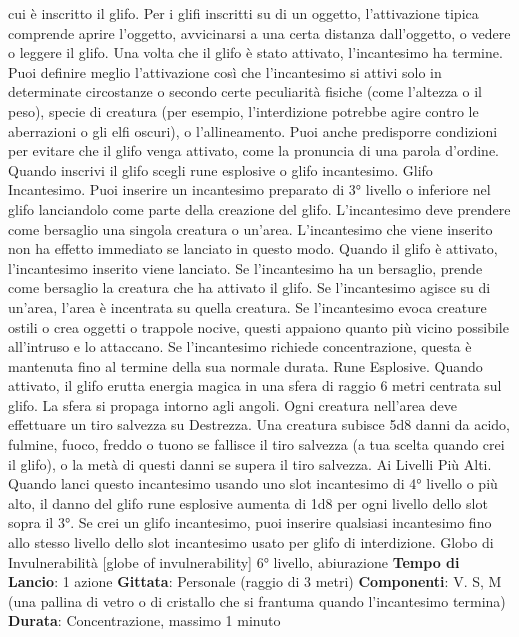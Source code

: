\begin{multicols}{2}
cui è inscritto il glifo.
Per i glifi inscritti su di un oggetto, l’attivazione tipica
comprende aprire l’oggetto, avvicinarsi a una certa
distanza dall’oggetto, o vedere o leggere il glifo. Una
volta che il glifo è stato attivato, l’incantesimo ha
termine.
Puoi definire meglio l’attivazione così che l’incantesimo
si attivi solo in determinate circostanze o secondo certe
peculiarità fisiche (come l’altezza o il peso), specie di
creatura (per esempio, l’interdizione potrebbe agire
contro le aberrazioni o gli elfi oscuri), o l’allineamento.
Puoi anche predisporre condizioni per evitare che il glifo
venga attivato, come la pronuncia di una parola
d’ordine.
Quando inscrivi il glifo scegli rune esplosive o glifo
incantesimo.
Glifo Incantesimo. Puoi inserire un incantesimo
preparato di 3° livello o inferiore nel glifo lanciandolo
come parte della creazione del glifo. L’incantesimo
deve prendere come bersaglio una singola creatura o
un’area. L’incantesimo che viene inserito non ha effetto
immediato se lanciato in questo modo. Quando il glifo è
attivato, l’incantesimo inserito viene lanciato. Se
l’incantesimo ha un bersaglio, prende come bersaglio la
creatura che ha attivato il glifo. Se l’incantesimo agisce
su di un’area, l’area è incentrata su quella creatura. Se
l’incantesimo evoca creature ostili o crea oggetti o
trappole nocive, questi appaiono quanto più vicino
possibile all’intruso e lo attaccano. Se l’incantesimo
richiede concentrazione, questa è mantenuta fino al
termine della sua normale durata.
Rune Esplosive. Quando attivato, il glifo erutta energia
magica in una sfera di raggio 6 metri centrata sul glifo.
La sfera si propaga intorno agli angoli. Ogni creatura
nell’area deve effettuare un tiro salvezza su Destrezza.
Una creatura subisce 5d8 danni da acido, fulmine,
fuoco, freddo o tuono se fallisce il tiro salvezza (a tua
scelta quando crei il glifo), o la metà di questi danni se
supera il tiro salvezza.
Ai Livelli Più Alti. Quando lanci questo incantesimo
usando uno slot incantesimo di 4° livello o più alto, il
danno del glifo rune esplosive aumenta di 1d8 per ogni
livello dello slot sopra il 3°. Se crei un glifo incantesimo,
puoi inserire qualsiasi incantesimo fino allo stesso
livello dello slot incantesimo usato per glifo di
interdizione.
Globo di Invulnerabilità
[globe of invulnerability]
6° livello, abiurazione
\textbf{Tempo di Lancio}: 1 azione
\textbf{Gittata}: Personale (raggio di 3 metri)
\textbf{Componenti}: V. S, M (una pallina di vetro o di cristallo
che si frantuma quando l’incantesimo termina)
\textbf{Durata}: Concentrazione, massimo 1 minuto

\end{multicols}
